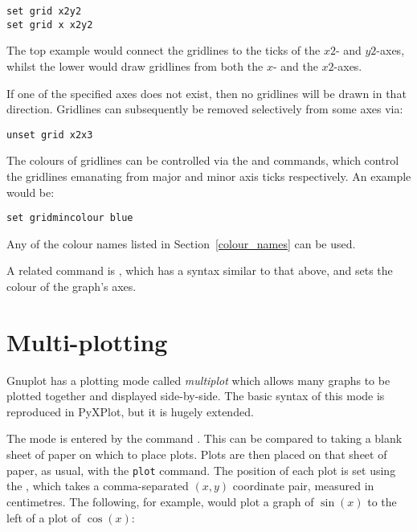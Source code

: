 \begin{verbatim}
set grid x2y2
set grid x x2y2
\end{verbatim}

\noindent The top example would connect the gridlines to the ticks of the $x2$-
and $y2$-axes, whilst the lower would draw gridlines from both the $x$- and the
$x2$-axes.

If one of the specified axes does not exist, then no gridlines will be drawn in
that direction.  Gridlines can subsequently be removed selectively from some
axes via:

\begin{verbatim}
unset grid x2x3
\end{verbatim}

The colours of gridlines can be
controlled via the  and  commands, which control the gridlines emanating from major and
minor axis ticks respectively. An example would be:

\begin{verbatim}
set gridmincolour blue
\end{verbatim}

\noindent Any of the colour names listed in Section~\ref{colour_names} can be
used.

A related command is , which has a syntax similar to that above, and sets the colour of
the graph's axes.\label{set_colours}

\section{Multi-plotting}
\label{multiplot}

Gnuplot has a plotting mode called {\it multiplot} which allows many graphs to
be plotted together and displayed side-by-side. The basic syntax of this mode
is reproduced in PyXPlot, but it is hugely extended.

The mode is entered by the command .  This can be
compared to taking a blank sheet of paper on which to place plots.  Plots are
then placed on that sheet of paper, as usual, with the {\tt plot} command. The
position of each plot is set using the , which takes a
comma-separated $(x,y)$ coordinate pair, measured in centimetres. The
following, for example, would plot a graph of $\sin(x)$ to the left of a plot
of $\cos(x)$:

